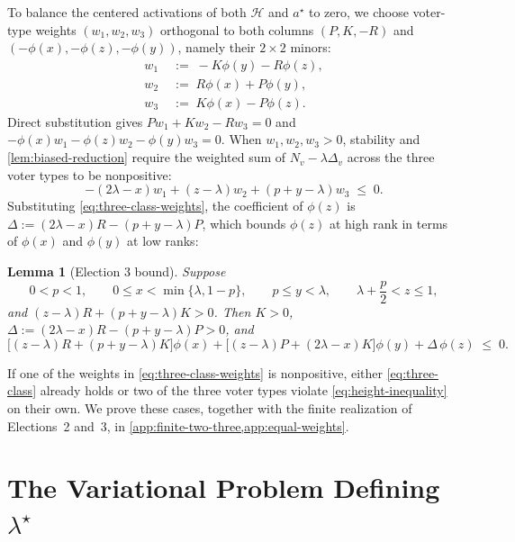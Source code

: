 \documentclass[11pt]{article}
\numberwithin{equation}{section}
\theoremstyle{plain}
\newtheorem{lemma}[theorem]{Lemma}
\theoremstyle{definition}
\newcommand{\1}{\mathbf{1}}
\newcommand{\calH}{\mathcal{H}}
\begin{document}
To balance the centered activations of both $\calH$ and $a^\star$ to zero, we choose voter-type weights $(w_1, w_2, w_3)$ orthogonal to both columns $(P, K, -R)$ and $(-\phi(x), -\phi(z), -\phi(y))$, namely their $2 \times 2$ minors:
\begin{equation}
  \begin{aligned}
    w_1 &\;:=\; -K\phi(y) - R\phi(z), \\
    w_2 &\;:=\; R\phi(x) + P\phi(y), \\
    w_3 &\;:=\; K\phi(x) - P\phi(z).
  \end{aligned}
  \label{eq:three-class-weights}
\end{equation}
Direct substitution gives $P w_1 + K w_2 - R w_3 = 0$ and $-\phi(x)w_1 - \phi(z)w_2 - \phi(y)w_3 = 0$. When $w_1, w_2, w_3 > 0$, stability and \cref{lem:biased-reduction} require the weighted sum of $N_v - \lambda\Delta_v$ across the three voter types to be nonpositive:
\[
  -(2\lambda - x)w_1 + (z - \lambda)w_2 + (p + y - \lambda)w_3 \;\le\; 0.
\]
Substituting \cref{eq:three-class-weights}, the coefficient of $\phi(z)$ is $\Delta := (2\lambda - x)R - (p + y - \lambda)P$, which bounds $\phi(z)$ at high rank in terms of $\phi(x)$ and $\phi(y)$ at low ranks:

\begin{lemma}[Election 3 bound]
\label{lem:election-3}
Suppose
\[
  0 < p < 1,
  \qquad
  0 \le x < \min\{\lambda, 1 - p\},
  \qquad
  p \le y < \lambda,
  \qquad
  \lambda + \frac{p}{2} < z \le 1,
\]
and $(z - \lambda)R + (p + y - \lambda)K > 0$. Then $K > 0$, $\Delta := (2\lambda - x)R - (p + y - \lambda)P > 0$, and
\begin{equation}
  \bigl[(z - \lambda)R + (p + y - \lambda)K\bigr]\phi(x)
  + \bigl[(z - \lambda)P + (2\lambda - x)K\bigr]\phi(y)
  + \Delta\,\phi(z) \;\le\; 0.
  \label{eq:three-class}
\end{equation}
\end{lemma}

If one of the weights in \cref{eq:three-class-weights} is nonpositive, either \cref{eq:three-class} already holds or two of the three voter types violate \cref{eq:height-inequality} on their own. We prove these cases, together with the finite realization of Elections~2 and~3, in \cref{app:finite-two-three,app:equal-weights}.

\section{The Variational Problem Defining \texorpdfstring{$\lambda^\star$}{lambda*}}
\label{sec:variational}
\end{document}
